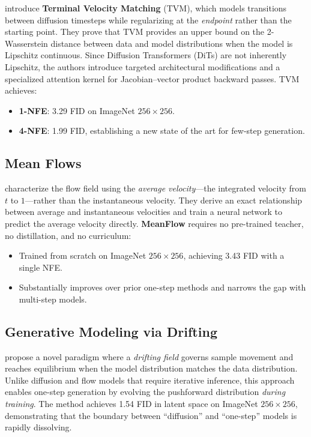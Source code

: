 \documentclass[11pt]{article}
\begin{document}
\citet{zhou2025tvm} introduce \textbf{Terminal Velocity Matching} (TVM), which models transitions between diffusion timesteps while regularizing at the \emph{endpoint} rather than the starting point.
They prove that TVM provides an upper bound on the 2-Wasserstein distance between data and model distributions when the model is Lipschitz continuous.
Since Diffusion Transformers (DiTs) are not inherently Lipschitz, the authors introduce targeted architectural modifications and a specialized attention kernel for Jacobian--vector product backward passes.
TVM achieves:
\begin{itemize}
    \item \textbf{1-NFE}: 3.29 FID on ImageNet $256 \times 256$.
    \item \textbf{4-NFE}: 1.99 FID, establishing a new state of the art for few-step generation.
\end{itemize}

\subsection{Mean Flows}

\citet{geng2025meanflow} characterize the flow field using the \emph{average velocity}---the integrated velocity from $t$ to $1$---rather than the instantaneous velocity.
They derive an exact relationship between average and instantaneous velocities and train a neural network to predict the average velocity directly.
\textbf{MeanFlow} requires no pre-trained teacher, no distillation, and no curriculum:
\begin{itemize}
    \item Trained from scratch on ImageNet $256 \times 256$, achieving 3.43 FID with a single NFE.
    \item Substantially improves over prior one-step methods and narrows the gap with multi-step models.
\end{itemize}

\subsection{Generative Modeling via Drifting}

\citet{deng2026drifting} propose a novel paradigm where a \emph{drifting field} governs sample movement and reaches equilibrium when the model distribution matches the data distribution.
Unlike diffusion and flow models that require iterative inference, this approach enables one-step generation by evolving the pushforward distribution \emph{during training}.
The method achieves 1.54 FID in latent space on ImageNet $256 \times 256$, demonstrating that the boundary between ``diffusion'' and ``one-step'' models is rapidly dissolving.
\end{document}
